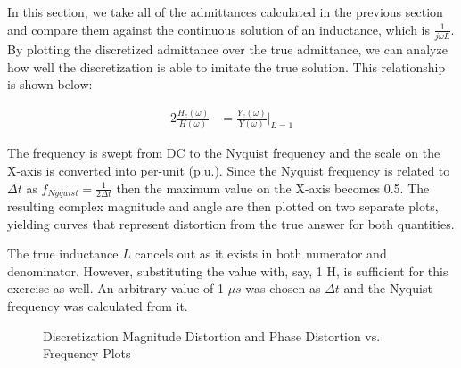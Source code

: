 \documentclass[10pt, oneside, letterpaper]{article}
\begin{document}
In this section, we take all of the admittances calculated in the previous section and compare them against the continuous solution of an inductance, which is $\frac{1}{j\omega{}L}$. By plotting the discretized admittance over the true admittance, we can analyze how well the discretization is able to imitate the true solution. This relationship is shown below:

\begin{alignat}{2}
\frac{H_e(\omega{})}{H(\omega{})} &= \frac{Y_e(\omega{})}{Y(\omega{})}\Biggr|_{L=1}^{}
\end{alignat}

The frequency is swept from DC to the Nyquist frequency and the scale on the X-axis is converted into per-unit (p.u.). Since the Nyquist frequency is related to $\Delta{}t$ as $f_{Nyquist} = \frac{1}{2\Delta{}t}$ then the maximum value on the X-axis becomes 0.5. The resulting complex magnitude and angle are then plotted on two separate plots, yielding curves that represent distortion from the true answer for both quantities.

The true inductance $L$ cancels out as it exists in both numerator and denominator. However, substituting the value with, say, 1 H, is sufficient for this exercise as well. An arbitrary value of 1 $\mu{}s$ was chosen as $\Delta{}t$ and the Nyquist frequency was calculated from it.

\begin{figure}[H]
  \begin{center}
    
  \end{center}
  \caption{Discretization Magnitude Distortion and Phase Distortion vs. Frequency Plots}
  \label{h_plots}
\end{figure}

\newpage
\end{document}
